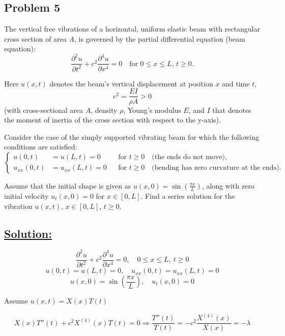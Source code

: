 \documentclass{article}
\begin{document}
\begin{tcolorbox}[colback=white, colframe=black, boxrule=0.8pt, arc=2mm]

\section*{Problem 5}
The vertical free vibrations of a horizontal, uniform elastic beam with rectangular cross section of area $A$, is governed by the partial differential equation (beam equation):
\[
\frac{\partial^2 u}{\partial t^2} + c^2 \frac{\partial^4 u}{\partial x^4} = 0 \quad \text{for } 0 \leq x \leq L, \, t \geq 0.
\]

Here $u(x,t)$ denotes the beam’s vertical displacement at position $x$ and time $t$, 
\[
c^2 = \frac{EI}{\rho A} > 0
\]
(with cross-sectional area $A$, density $\rho$, Young’s modulus $E$, and $I$ that denotes the moment of inertia of the cross section with respect to the y-axis).

\medskip

Consider the case of the simply supported vibrating beam for which the following conditions are satisfied:
\[
\left\{
\begin{aligned}
u(0,t) &= u(L,t) = 0 &&\text{for } t \geq 0 \quad \text{(the ends do not move)}, \\
u_{xx}(0,t) &= u_{xx}(L,t) = 0 &&\text{for } t \geq 0 \quad \text{(bending has zero curvature at the ends)}.
\end{aligned}
\right.
\]

\medskip

Assume that the initial shape is given as $u(x,0) = \sin\left(\frac{\pi x}{L}\right)$, along with zero initial velocity $u_t(x,0) = 0$ for $x \in [0, L]$. Find a series solution for the vibration $u(x,t)$, $x \in [0, L]$, $t \geq 0$.

\end{tcolorbox}

\subsection*{\underline{Solution:}}

\[
\frac{\partial^2 u}{\partial t^2} + c^2 \frac{\partial^4 u}{\partial x^4} = 0, \quad 0 \leq x \leq L,\ t \geq 0
\]
\[
u(0,t) = u(L,t) = 0, \quad u_{xx}(0,t) = u_{xx}(L,t) = 0
\]
\[
u(x,0) = \sin\left(\frac{\pi x}{L}\right), \quad u_t(x,0) = 0
\]

Assume $u(x,t) = X(x)T(t)$

\[
X(x)T''(t) + c^2 X^{(4)}(x) T(t) = 0
\Rightarrow
\frac{T''(t)}{T(t)} = -c^2 \frac{X^{(4)}(x)}{X(x)} = -\lambda
\]
\end{document}
